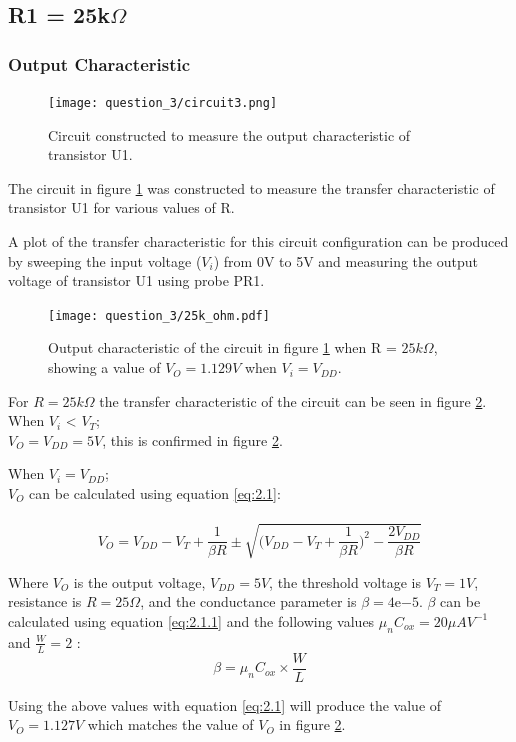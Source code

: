 \documentclass[11pt, a4paper]{article}
\begin{document}
\subsection{R1 = 25k$\Omega$}
\subsubsection{Output Characteristic}

\begin{figure}
  \centering
    \caption{Circuit constructed to measure the output characteristic of transistor U1.}
    \label{fig:circuit3}
    \texttt{[image: question\_3/circuit3.png]}
\end{figure}

The circuit in figure \ref{fig:circuit3} was constructed to measure the transfer characteristic of transistor U1 for various values of R.

A plot of the transfer characteristic for this circuit configuration can be produced by sweeping the input voltage ($V_i$) from 0V to 5V and measuring the output voltage of transistor U1 using probe PR1.

\begin{figure}
  \centering
  \texttt{[image: question\_3/25k\_ohm.pdf]}
  \caption{\centering Output characteristic of the circuit in figure \ref{fig:circuit3} when R = $25k \Omega$, showing a value of $V_O = 1.129V$ when $V_i = V_{DD}$.}
    \label{fig:graph4}
\end{figure}

For $R = 25k\Omega$ the transfer characteristic of the circuit can be seen in figure \ref{fig:graph4}.\\
When $V_i$ < $V_T$;\\ $V_O = V_{DD} = 5V$, this is confirmed in figure \ref{fig:graph4}.

When $V_i = V_{DD}$;\\ $V_O$ can be calculated using equation \ref{eq:2.1}:
\\~\\
\begin{equation}
  V_O = V_{DD} - V_T + \frac{1}{\beta R} \pm \sqrt{\bigg(V_{DD} - V_T + \frac{1}{\beta R} \bigg)^2 - \frac{2V_{DD}}{\beta R}}
  \label{eq:2.1}
\end{equation}

Where $V_O  $ is the output voltage, $V_{DD} = 5V$, the threshold voltage is $V_T = 1V$, resistance is 
$R = 25\Omega$, and the conductance parameter is $\beta = 4\mathrm{e}{-5}$. $\beta$ can be calculated using equation \ref{eq:2.1.1} and the following values $\mu_n C_{ox} = 20 \mu A V^{-1}$ and $\frac{W}{L} = 2$ :
\begin{equation}
    \beta = \mu_n C_{ox} \times \frac{W}{L}
    \label{eq:2.1.1}
\end{equation}
 \par
Using the above values with equation \ref{eq:2.1} will produce the value of $V_O = 1.127V$ which matches the value of $V_O$ in figure \ref{fig:graph4}.
\end{document}

